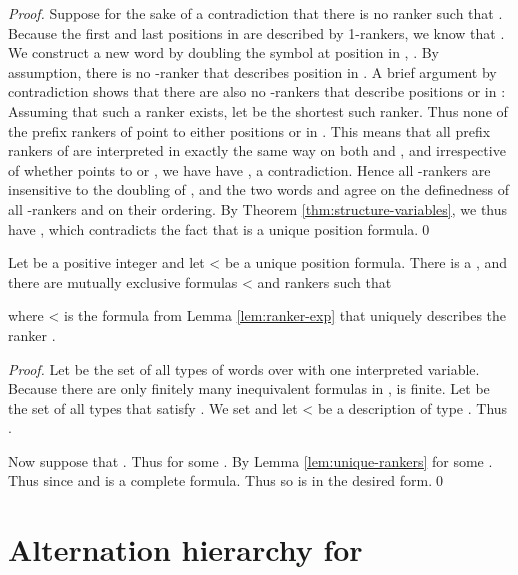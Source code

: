 \documentclass{LMCS}
\newcommand{\qedconf}{}
\renewcommand{\qedconf}{\qed}
\begin{document}
\begin{full}
\begin{proof}
  Suppose for the sake of a contradiction that there is no ranker  such that . Because the first and
  last positions in  are described by 1-rankers, we know that .
  We construct a new word  by doubling the symbol at position  in ,
  . By assumption,
  there is no -ranker that describes position  in . A brief
  argument by contradiction shows that there are also no -rankers that
  describe positions  or  in : Assuming that such a ranker
  exists, let  be the shortest such ranker. Thus none of the prefix
  rankers of  point to either positions  or  in . This means
  that all prefix rankers of  are interpreted in exactly the same way on
  both  and , and irrespective of whether  points to  or
  , we have have , a
  contradiction. Hence all -rankers are insensitive to the doubling of
  , and the two
  words  and  agree on the definedness of all -rankers and on their
  ordering. 
  By
  Theorem \ref{thm:structure-variables}, we thus have , which contradicts the fact that 
  is a unique position formula.\qedconf
\end{proof}
\end{full}


\begin{thm} \label{thm:unique-rankers}
  Let  be a positive integer and let < be a
  unique position formula. There is a , and there
  are mutually exclusive formulas < and rankers
   such that
  
  where < is the formula from Lemma
  \ref{lem:ranker-exp} that uniquely describes the ranker .
\end{thm}

\begin{full}
\begin{proof}
  Let  be the set of all  types of words over
   with one interpreted variable. Because there are only finitely
  many inequivalent formulas in ,  is finite. Let
   be the set of all types that satisfy
  . We set  and let < be a description of type .  Thus .

  Now suppose that . Thus 
  for some . By Lemma \ref{lem:unique-rankers}  for some . Thus  since  and  is a complete
   formula. Thus  so
   is in the desired form.\qedconf
\end{proof}
\end{full}


\section{Alternation hierarchy for \texorpdfstring{}{FOV[<]2}} \label{sec:FO2-alt}
\end{document}
